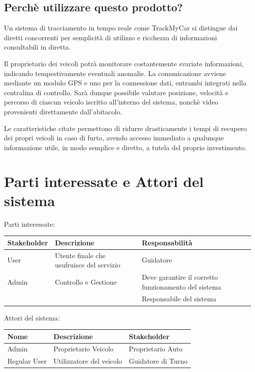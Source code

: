 \documentclass[a4paper,12pt]{article}
\begin{document}
\pagebreak

\subsection{Perchè utilizzare questo prodotto?}
Un sistema di tracciamento in tempo reale come TrackMyCar si distingue dai diretti concorrenti per semplicità di utilizzo e ricchezza di informazioni consultabili in diretta.

Il proprietario dei veicoli potrà monitorare costantemente svariate informazioni, indicando tempestivamente eventuali anomalie. La comunicazione avviene mediante un modulo GPS e uno per la connessione dati, entrambi integrati nella centralina di controllo. Sarà dunque possibile valutare posizione, velocità e percorso di ciascun veicolo iscritto all'interno del sistema, nonchè video provenienti direttamente dall'abitacolo.

Le caratteristiche citate permettono di ridurre drasticamente i tempi di recupero dei propri veicoli in caso di furto, avendo accesso immediato a qualunque informazione utile, in modo semplice e diretto, a tutela del proprio investimento.



\section{Parti interessate e Attori del sistema}

\begin{table}[h]
Parti interessate:
\begin{center}
\begin{tabular}{ p{2 cm}  p{7 cm}  p{4 cm} }
\rowcolor{Ash}	
\hline	
Stakeholder & Descrizione & Responsabilità \\ \hline
User & Utente finale che usufruisce del servizio & Guidatore\\ 
Admin & Controllo e Gestione & Deve garantire il corretto funzionamento del sistema \\ 
 &  & Responsabile del sistema \\ \hline
\end{tabular}
\end{center}
\end{table}

\begin{table}[h]
Attori del sistema:
\begin{center}
\begin{tabular}{ p{2 cm}  p{7 cm}  p{4 cm} }
\rowcolor{Ash}	
\hline	
Nome & Descrizione & Stakeholder \\ \hline
Admin & Proprietario Veicolo & Proprietario Auto \\ 
Regular User & Utilizzatore del veicolo & Guidatore di Turno \\ \hline
\end{tabular}
\end{center}
\end{table}
\end{document}
